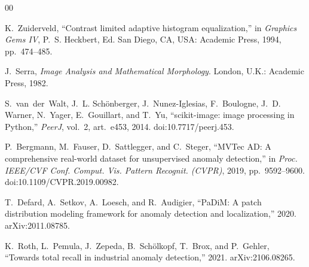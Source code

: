 \documentclass[journal]{IEEEtran}
\begin{document}
\begin{thebibliography}{00}

 K.~Zuiderveld, ``Contrast limited adaptive histogram equalization,'' in \emph{Graphics Gems IV},
P.~S. Heckbert, Ed. San Diego, CA, USA: Academic Press, 1994, pp.~474--485.

 J.~Serra, \emph{Image Analysis and Mathematical Morphology}. London, U.K.: Academic Press, 1982.

 S.~van~der~Walt, J.~L. Sch\"onberger, J.~Nunez-Iglesias, F.~Boulogne, J.~D. Warner, N.~Yager,
E.~Gouillart, and T.~Yu, ``scikit-image: image processing in Python,'' \emph{PeerJ}, vol.~2, art.~e453, 2014.
doi:10.7717/peerj.453.

 P.~Bergmann, M.~Fauser, D.~Sattlegger, and C.~Steger, ``MVTec AD: A comprehensive real-world
dataset for unsupervised anomaly detection,'' in \emph{Proc. IEEE/CVF Conf. Comput. Vis. Pattern Recognit.
(CVPR)}, 2019, pp.~9592--9600. doi:10.1109/CVPR.2019.00982.

 T.~Defard, A.~Setkov, A.~Loesch, and R.~Audigier, ``PaDiM: A patch distribution modeling framework
for anomaly detection and localization,'' 2020. arXiv:2011.08785.

 K.~Roth, L.~Pemula, J.~Zepeda, B.~Sch\"olkopf, T.~Brox, and P.~Gehler, ``Towards total recall
in industrial anomaly detection,'' 2021. arXiv:2106.08265.

\end{thebibliography}
\end{document}
